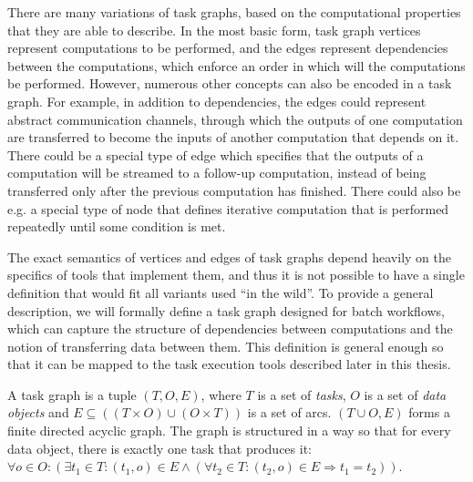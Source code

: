 There are many variations of task graphs, based on the computational properties that they are able
to describe. In the most basic form, task graph vertices represent computations to be performed,
and the edges represent dependencies between the computations, which enforce an order in which will
the computations be performed. However, numerous other concepts can also be encoded in a task
graph. For example, in addition to dependencies, the edges could represent abstract communication
channels, through which the outputs of one computation are transferred to become the inputs of
another computation that depends on it. There could be a special type of edge which specifies that
the outputs of a computation will be streamed to a follow-up computation, instead of being
transferred only after the previous computation has finished. There could also be e.g. a special
type of node that defines iterative computation that is performed repeatedly until some condition
is met.

The exact semantics of vertices and edges of task graphs depend heavily on the specifics of tools
that implement them, and thus it is not possible to have a single definition that would fit all
variants used ``in the wild''. To provide a general description, we will formally define a task
graph designed for batch workflows, which can capture the structure of dependencies between
computations and the notion of transferring data between them. This definition is general enough so
that it can be mapped to the task execution tools described later in this thesis.

A task graph is a tuple $(T, O, E)$, where $T$ is a set of
\emph{tasks}, $O$ is a set of \emph{data objects} and
$E \subseteq ((T\times{}O) \cup (O\times{}T))$ is a set of arcs. $(T \cup O, E)$ forms a finite directed acyclic
graph. The graph is structured in a way so that for every data object, there is exactly one task
that produces it: $\forall o\in{}O: (\exists t_1\in{}T: (t_1, o) \in E \land
	(\forall
	t_2\in{}T: (t_2, o) \in E \Rightarrow t_1 = t_2))$.

